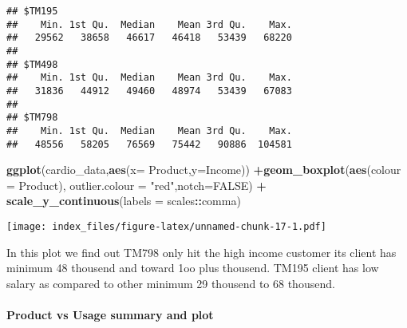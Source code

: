 \documentclass[
]{article}
\newenvironment{Shaded}{\begin{snugshade}}{\end{snugshade}}
\newcommand{\CommentTok}[1]{\textcolor[rgb]{0.56,0.35,0.01}{\textit{#1}}}
\newcommand{\DataTypeTok}[1]{\textcolor[rgb]{0.13,0.29,0.53}{#1}}
\newcommand{\KeywordTok}[1]{\textcolor[rgb]{0.13,0.29,0.53}{\textbf{#1}}}
\newcommand{\NormalTok}[1]{#1}
\newcommand{\OperatorTok}[1]{\textcolor[rgb]{0.81,0.36,0.00}{\textbf{#1}}}
\newcommand{\OtherTok}[1]{\textcolor[rgb]{0.56,0.35,0.01}{#1}}
\newcommand{\StringTok}[1]{\textcolor[rgb]{0.31,0.60,0.02}{#1}}
\begin{document}
\begin{Shaded}
\end{Shaded}

\begin{verbatim}
## $TM195
##    Min. 1st Qu.  Median    Mean 3rd Qu.    Max. 
##   29562   38658   46617   46418   53439   68220 
## 
## $TM498
##    Min. 1st Qu.  Median    Mean 3rd Qu.    Max. 
##   31836   44912   49460   48974   53439   67083 
## 
## $TM798
##    Min. 1st Qu.  Median    Mean 3rd Qu.    Max. 
##   48556   58205   76569   75442   90886  104581
\end{verbatim}

\begin{Shaded}
\begin{Highlighting}[]
\KeywordTok{ggplot}\NormalTok{(cardio_data,}\KeywordTok{aes}\NormalTok{(}\DataTypeTok{x=}\NormalTok{ Product,}\DataTypeTok{y=}\NormalTok{Income)) }\OperatorTok{+}\KeywordTok{geom_boxplot}\NormalTok{(}\KeywordTok{aes}\NormalTok{(}\DataTypeTok{colour =}\NormalTok{ Product), }\DataTypeTok{outlier.colour =} \StringTok{"red"}\NormalTok{,}\DataTypeTok{notch=}\OtherTok{FALSE}\NormalTok{) }\OperatorTok{+}\StringTok{ }\KeywordTok{scale_y_continuous}\NormalTok{(}\DataTypeTok{labels =}\NormalTok{ scales}\OperatorTok{::}\NormalTok{comma)}
\end{Highlighting}
\end{Shaded}

\texttt{[image: index\_files/figure-latex/unnamed-chunk-17-1.pdf]}

In this plot we find out TM798 only hit the high income customer its
client has minimum 48 thousend and toward 1oo plus thousend. TM195
client has low salary as compared to other minimum 29 thousend to 68
thousend.

\hypertarget{product-vs-usage-summary-and-plot}{%
\paragraph{Product vs Usage summary and
plot}\label{product-vs-usage-summary-and-plot}}

\begin{Shaded}
\end{Shaded}
\end{document}
